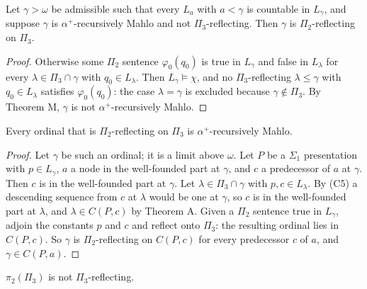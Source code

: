 \documentclass[11pt]{article}
\begin{document}
\begin{statement} Let $\gamma > \omega$ be admissible such that every $L_a$ with $a < \gamma$ is countable in $L_{\gamma}$, and
suppose $\gamma$ is $\alpha^+$-recursively Mahlo and not $\Pi_3$-reflecting. Then $\gamma$ is $\Pi_2$-reflecting on $\Pi_3$.
\end{statement}

\begin{proof}
Otherwise some $\Pi_2$ sentence $\varphi_0(q_0)$ is true in $L_{\gamma}$ and false in $L_{\lambda}$ for every
$\lambda \in \Pi_3 \cap \gamma$ with $q_0 \in L_{\lambda}$. Then $L_{\gamma} \models \chi$, and no $\Pi_3$-reflecting
$\lambda \le \gamma$ with $q_0 \in L_{\lambda}$ satisfies $\varphi_0(q_0)$: the case $\lambda = \gamma$ is excluded because
$\gamma \notin \Pi_3$. By Theorem M, $\gamma$ is not $\alpha^+$-recursively Mahlo.
\end{proof}

\begin{statement} Every ordinal that is $\Pi_2$-reflecting on $\Pi_3$ is $\alpha^+$-recursively Mahlo.
\end{statement}

\begin{proof}
Let $\gamma$ be such an ordinal; it is a limit above $\omega$. Let $P$ be a $\Sigma_1$ presentation with
$p \in L_{\gamma}$, $a$ a node in the well-founded part at $\gamma$, and $c$ a predecessor of $a$ at $\gamma$. Then $c$
is in the well-founded part at $\gamma$. Let $\lambda \in \Pi_3 \cap \gamma$ with $p, c \in L_{\lambda}$. By (C5) a descending
sequence from $c$ at $\lambda$ would be one at $\gamma$, so $c$ is in the well-founded part at $\lambda$, and
$\lambda \in C(P, c)$ by Theorem A. Given a $\Pi_2$ sentence true in $L_{\gamma}$, adjoin the constants $p$ and $c$ and
reflect onto $\Pi_3$: the resulting ordinal lies in $C(P, c)$. So $\gamma$ is $\Pi_2$-reflecting on $C(P, c)$ for every
predecessor $c$ of $a$, and $\gamma \in C(P, a)$.
\end{proof}

\begin{statement} $\pi_2(\Pi_3)$ is not $\Pi_3$-reflecting.
\end{statement}
\end{document}

